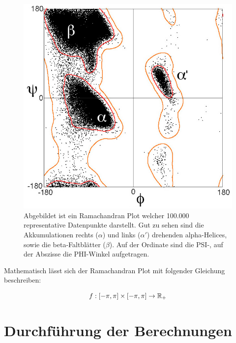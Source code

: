 \begin{figure}
\includegraphics[width=.95\textwidth]{images/Ramaplot.png}
\caption{Abgebildet ist ein Ramachandran Plot welcher 100.000 representative Datenpunkte darstellt. Gut zu sehen sind die Akkumulationen rechts ($\alpha$) und links ($\alpha'$) drehenden alpha-Helices, sowie die beta-Faltblätter ($\beta$). Auf der Ordinate sind die PSI-, auf der Abszisse die PHI-Winkel aufgetragen\protect\footnotemark.}
\label{fig:ramaplot}
\end{figure}

Mathematisch lässt sich der Ramachandran Plot mit folgender Gleichung beschreiben:

\begin{equation}
    f : [-\pi,\pi]\times[-\pi,\pi] \rightarrow \mathbb{R}_{+}
    \label{eq:rama_eq}
\end{equation}


\newpage
\section{Durchführung der Berechnungen}


